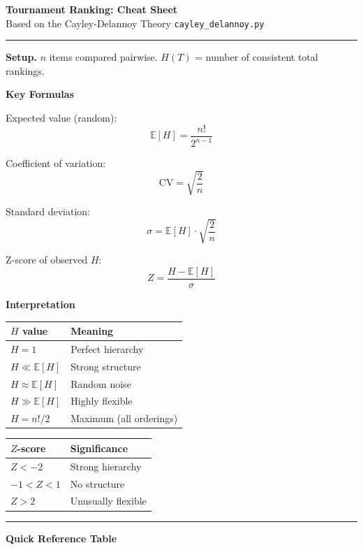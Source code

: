 \documentclass[10pt]{article}
\begin{document}
\begin{center}
{\LARGE\bfseries Tournament Ranking: Cheat Sheet}\\[4pt]
{\small Based on the Cayley-Delannoy Theory \hfill \texttt{cayley\_delannoy.py}}
\end{center}

\hrule\medskip

\textbf{Setup.} $n$ items compared pairwise. $H(T)$ = number of consistent total rankings.

\medskip
\begin{minipage}[t]{0.48\textwidth}
\textbf{Key Formulas}

Expected value (random):
\[ \mathbb{E}[H] = \frac{n!}{2^{n-1}} \]

Coefficient of variation:
\[ \mathrm{CV} = \sqrt{\frac{2}{n}} \]

Standard deviation:
\[ \sigma = \mathbb{E}[H] \cdot \sqrt{\frac{2}{n}} \]

Z-score of observed $H$:
\[ Z = \frac{H - \mathbb{E}[H]}{\sigma} \]
\end{minipage}
\hfill
\begin{minipage}[t]{0.48\textwidth}
\textbf{Interpretation}

\begin{tabular}{@{}ll@{}}
\toprule
$H$ value & Meaning \\
\midrule
$H = 1$ & Perfect hierarchy \\
$H \ll \mathbb{E}[H]$ & Strong structure \\
$H \approx \mathbb{E}[H]$ & Random noise \\
$H \gg \mathbb{E}[H]$ & Highly flexible \\
$H = n!/2$ & Maximum (all orderings) \\
\bottomrule
\end{tabular}

\medskip

\begin{tabular}{@{}ll@{}}
\toprule
$Z$-score & Significance \\
\midrule
$Z < -2$ & Strong hierarchy \\
$-1 < Z < 1$ & No structure \\
$Z > 2$ & Unusually flexible \\
\bottomrule
\end{tabular}
\end{minipage}

\medskip\hrule\medskip

\textbf{Quick Reference Table}
\end{document}

